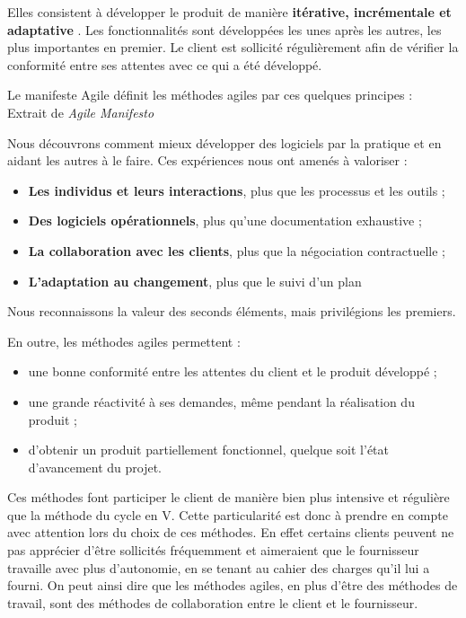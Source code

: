 Elles consistent à développer le produit de manière \textbf{itérative, incrémentale et adaptative} . Les fonctionnalités sont développées les unes après les autres, les plus importantes en premier. Le client est sollicité régulièrement afin de vérifier la conformité entre ses attentes avec ce qui a été développé.

Le manifeste Agile  définit les méthodes agiles par ces quelques principes :\\

Extrait de \textit{Agile Manifesto}

\begin{Quote}
Nous découvrons comment mieux développer des logiciels par la pratique et en aidant les autres à le faire.
Ces expériences nous ont amenés à valoriser :

\begin{itemize}
\item \textbf{Les individus et leurs interactions}, plus que les processus et les outils ;
\item \textbf{Des logiciels opérationnels}, plus qu’une documentation exhaustive ;
\item \textbf{La collaboration avec les clients}, plus que la négociation contractuelle ;
\item \textbf{L’adaptation au changement}, plus que le suivi d’un plan
\end{itemize}

Nous reconnaissons la valeur des seconds éléments, mais privilégions les premiers.
\end{Quote}

En outre, les méthodes agiles permettent :

\begin{itemize}
\item une bonne conformité entre les attentes du client et le produit développé ;
\item une grande réactivité à ses demandes, même pendant la réalisation du produit ;
\item d'obtenir un produit partiellement fonctionnel, quelque soit l'état d'avancement du projet.
\end{itemize}

Ces méthodes font participer le client de manière bien plus intensive et régulière que la méthode du cycle en V. Cette particularité est donc à prendre en compte avec attention lors du choix de ces méthodes. En effet certains clients peuvent ne pas apprécier d'être sollicités fréquemment et aimeraient que le fournisseur travaille avec plus d'autonomie, en se tenant au cahier des charges qu'il lui a fourni. On peut ainsi dire que les méthodes agiles, en plus d'être des méthodes de travail, sont des méthodes de collaboration entre le client et le fournisseur.

